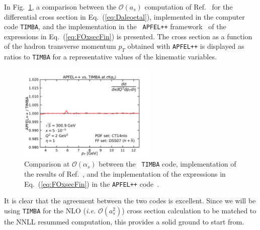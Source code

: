 \documentclass[10pt,a4paper]{article}
\begin{document}
In Fig.~\ref{fig:APFELvsTIMBA}, a comparison between the
$\mathcal{O}(a_s)$ computation of Ref.~\cite{Daleo:2004pn} for the
differential cross section in Eq.~(\ref{eq:Daleoetal}), implemented in
the computer code {\tt TIMBA}, and the implementation in the {\tt
  APFEL++} framework~\cite{Bertone:2017gds} of the expressions in
Eq.~(\ref{eq:FOxsecFin}) is presented. The cross section as a function
of the hadron transverse momentum $p_T$ obtained with {\tt APFEL++} is
displayed as ratios to {\tt TIMBA} for a representative values of the
kinematic variables.
\begin{figure}[t]
  \begin{centering}
    \includegraphics[width=0.6\textwidth]{../plots/APFELvsTIMBA}
    \caption{Comparison at $\mathcal{O}(\alpha_s)$ between the {\tt
        TIMBA} code, implementation of the results of
      Ref.~\cite{Daleo:2004pn}, and the implementation of the
      expressions in Eq.~(\ref{eq:FOxsecFin}) in the {\tt APFEL++}
      code~\cite{Bertone:2017gds}.\label{fig:APFELvsTIMBA}}
  \end{centering}
\end{figure}
It is clear that the agreement between the two codes is
excellent. Since we will be using {\tt TIMBA} for the NLO
(\textit{i.e.} $\mathcal{O}(a_s^2)$) cross section calculation to be
matched to the NNLL resummed computation, this provides a solid ground
to start from.
\end{document}
